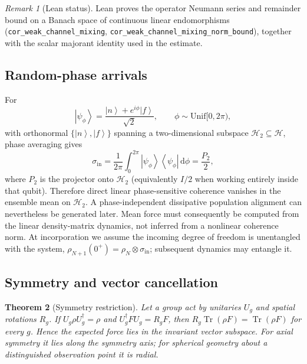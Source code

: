 \documentclass[11pt]{article}
\newtheorem{theorem}{Theorem}[section]
\theoremstyle{definition}
\theoremstyle{remark}
\newtheorem{remark}[theorem]{Remark}
\newcommand{\ket}[1]{\left|#1\right\rangle}
\newcommand{\bra}[1]{\left\langle#1\right|}
\newcommand{\dd}{\mathrm{d}}
\newcommand{\Tr}{\operatorname{Tr}}
\begin{document}
\begin{remark}[Lean status]
Lean proves the operator Neumann series and remainder bound on a Banach space of continuous linear endomorphisms (\texttt{cor\_weak\_channel\_mixing}, \texttt{cor\_weak\_channel\_mixing\_norm\_bound}), together with the scalar majorant identity used in the estimate.
\end{remark}

\subsection{Random-phase arrivals}
For
\begin{equation}
  \ket{\psi_\phi}=\frac{\ket{n}+e^{i\phi}\ket{f}}{\sqrt{2}},\qquad
  \phi\sim\mathrm{Unif}[0,2\pi),
\end{equation}
with orthonormal $\{\ket{n},\ket{f}\}$ spanning a two-dimensional subspace $\mathcal H_2\subseteq\mathcal H$, phase averaging gives
\begin{equation}
  \sigma_{\mathrm{in}}
  =\frac{1}{2\pi}\int_0^{2\pi}\ket{\psi_\phi}\bra{\psi_\phi}\,\dd\phi
  =\frac{P_2}{2},
\end{equation}
where $P_2$ is the projector onto $\mathcal H_2$ (equivalently $I/2$ when working entirely inside that qubit).
Therefore direct linear phase-sensitive coherence vanishes in the ensemble mean on $\mathcal H_2$.
A phase-independent dissipative population alignment can nevertheless be generated later.
Mean force must consequently be computed from the linear density-matrix dynamics, not inferred from a nonlinear coherence norm.
At incorporation we assume the incoming degree of freedom is unentangled with the system,
$\rho_{N+1}(0^+)=\rho_N\otimes\sigma_{\mathrm{in}}$; subsequent dynamics may entangle it.

\subsection{Symmetry and vector cancellation}

\begin{theorem}[Symmetry restriction]
Let a group act by unitaries $U_g$ and spatial rotations $R_g$.
If $U_g\rho U_g^\dagger=\rho$ and $U_g^\dagger F U_g=R_g F$, then
$R_g\Tr(\rho F)=\Tr(\rho F)$ for every $g$.
Hence the expected force lies in the invariant vector subspace.
For axial symmetry it lies along the symmetry axis; for spherical geometry about a distinguished observation point it is radial.
\end{theorem}
\end{document}
